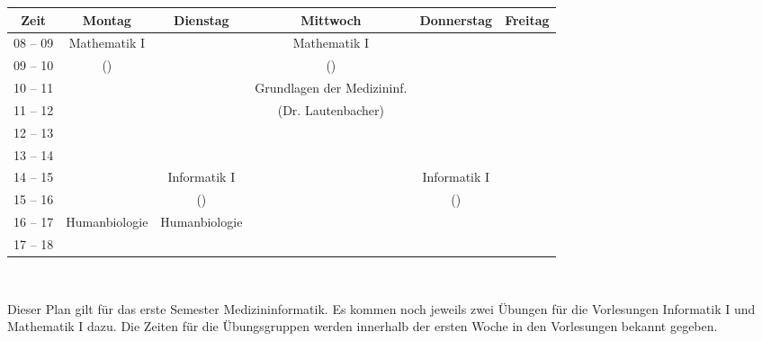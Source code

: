 \begin{minipage}{\textwidth}
    \footnotesize
\begin{center}
\begin{tabular}{|c|c|c|c|c|c|}
	\hline
	Zeit    & Montag       	& Dienstag    	& Mittwoch                  	& Donnerstag	& Freitag   \\\hline\hline
	08 – 09 & Mathematik I 	&             	& Mathematik I              	&				&			\\\cline{1-1}\cline{3-3}\cline{5-6}
	09 – 10 & (\Matheprof) 	&             	& (\Matheprof)              	&   			&			\\\hline
	10 – 11 &              	&             	& Grundlagen der Medizininf.	&				&			\\\cline{1-3}\cline{5-6}
	11 – 12 &              	&             	& (Dr. Lautenbacher)        	&				&			\\\hline
	12 – 13 &              	&             	&                           	&				&			\\\hline
	13 – 14 &              	&             	&                           	&				&			\\\hline
	14 – 15 &              	& Informatik I	&                           	& Informatik I	&			\\\cline{1-2}\cline{4-4}\cline{6-6}
	15 – 16 &              	& (\Infoprof) 	&                           	& (\Infoprof)	&			\\\hline
	16 – 17 & Humanbiologie	& Humanbiologie &                           	&				&			\\\cline{1-1}\cline{4-6}
	17 – 18 &              	&             	&                           	&				&			\\\hline
\end{tabular}
    ~\\
\end{center}
\end{minipage}
Dieser Plan gilt für das erste Semester Medizininformatik. Es kommen noch jeweils zwei Übungen für die Vorlesungen
Informatik I und Mathematik I dazu. Die Zeiten für die Übungsgruppen werden innerhalb der ersten Woche in den Vorlesungen bekannt gegeben. \\ \\

